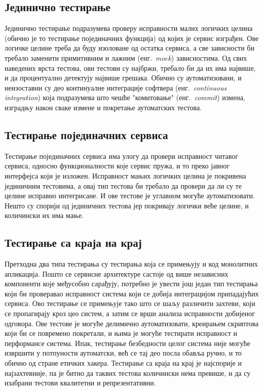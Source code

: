 \documentclass[12pt,oneside]{memoir}
\begin{document}
\subsection{Јединично тестирање}
Јединично тестирање подразумева проверу исправности малих логичких целина (обично је то тестирање појединачних функција) од којих је сервис изграђен. Ове логичке целине треба да буду изоловане од остатка сервиса, а све зависности би требало заменити примитивним и лажним (енг.~\textit{mock}) зависностима. Од свих наведених врста тестова, ови тестови су најбржи, требало би да их има највише, и да процентуално детектују највише грешака. Обично су аутоматизовани, и неизоставни су део континуалне интеграције софтвера (енг.~\textit{continuous integration}) која подразумева што чешће "комитовање" (енг.~\textit{commit}) измена, изградњу након сваке измене и покретање аутоматских тестова.

\subsection{Тестирање појединачних сервиса}
Тестирање појединачних сервиса има улогу да провери исправност читавог сервиса, односно функционалности које сервис пружа, и то преко јавног интерфејса који је изложен. Исправност мањих логичких целина је покривена јединичним тестовима, а овај тип тестова би требало да провери да ли су те целине исправно интегрисане. И ове тестове је углавном могуће аутоматизовати. Нешто су спорији од јединичних тестова јер покривају логички веће целине, и количински их има мање.

\subsection{Тестирање са краја на крај}
Претходна два типа тестирања су тестирања која се примењују и код монолитних апликација. Пошто се сервисне архитектуре састоје од више независних компоненти које међусобно сарађују, потребно је увести још један тип тестирања који би проверавао исправност система који се добија интеграцијом припадајућих сервиса. Ово тестирање се примењује тако што се шаљу различити захтеви, који се пропагирају кроз цео систем, а затим се врши анализа исправности добијеног одговора. Ове тестове је могуће делимично аутоматизовати, креирањем скриптова који би се повремено покретали, и њима је могуће тестирати исправност и перформансе система. Ипак, тестирање безбедности целог система није могуће извршити у потпуности аутоматски, већ се тај део посла обавља ручно, и то обично од стране етичких хакера. Тестирање са краја на крај је најспорије и најзахтевније, па је битно да таквих тестова количински нема превише, и да су изабрани тестови квалитетни и репрезентативни.
\end{document}
